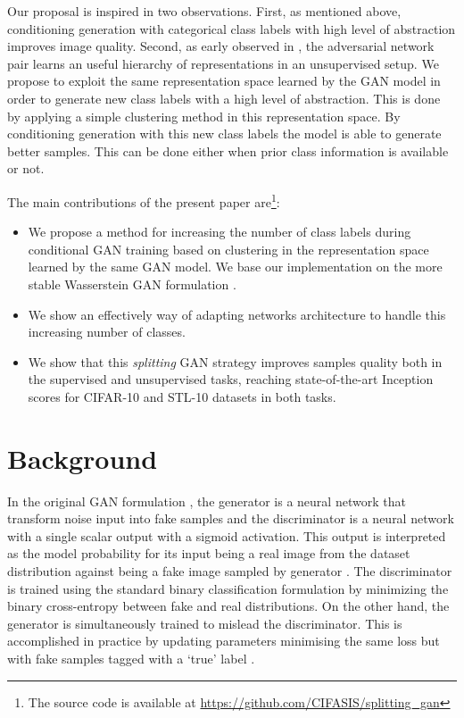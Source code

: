 \documentclass[times,twocolumn]{article}
\begin{document}
Our proposal is inspired in two observations. First, as mentioned above, conditioning generation with categorical class labels with high level of abstraction improves image quality. Second, as early observed in \cite{Goodfellow2014,Radford2015}, the adversarial network pair learns an useful hierarchy of representations in an unsupervised setup. We propose to exploit the same representation space learned by the GAN model in order to generate new class labels with a high level of abstraction. This is done by applying a simple clustering method in this representation space. By conditioning generation with this new class labels the model is able to generate better samples. This can be done either when prior class information is available or not.



The main contributions of the present paper are\footnote{The source code is available at \url{https://github.com/CIFASIS/splitting_gan}}:
\begin{itemize}
 \item We propose a method for increasing the number of class labels during conditional GAN training based on clustering in the representation space learned by the same GAN model. We base our implementation on the more stable Wasserstein GAN formulation \cite{Arjovsky2017b, Gulrajani2017}.
 \item We show an effectively way of adapting networks architecture to handle this increasing number of classes.
 \item We show that this \textit{splitting} GAN strategy improves samples quality both in the supervised and unsupervised tasks, reaching state-of-the-art Inception scores for CIFAR-10 and STL-10 datasets in both tasks.
\end{itemize}
\section{Background}
In the original GAN formulation \cite{Goodfellow2014}, the generator is a neural network that transform noise input  into fake samples and the discriminator  is a neural network with a single scalar output with a sigmoid activation. This output is interpreted as the model probability for its input being a real image from the dataset distribution against being a fake image sampled by generator . The discriminator  is trained using the standard binary classification formulation by minimizing the binary cross-entropy between fake and real distributions. On the other hand, the generator  is simultaneously trained to mislead the discriminator. This is accomplished in practice by updating  parameters minimising the same loss but with fake samples tagged with a `true' label \cite{Goodfellow2014}. 
\end{document}
